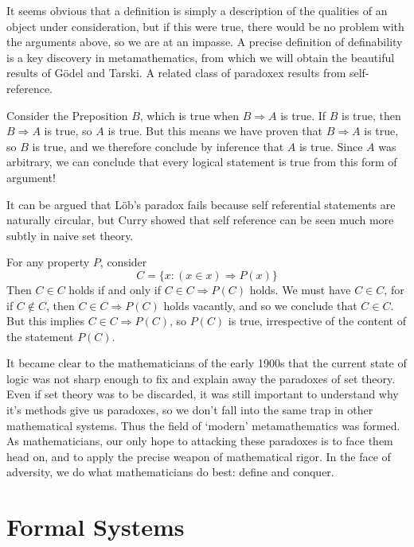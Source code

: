 It seems obvious that a definition is simply a description of the qualities of an object under consideration, but if this were true, there would be no problem with the arguments above, so we are at an impasse. A precise definition of definability is a key discovery in metamathematics, from which we will obtain the beautiful results of G\"{o}del and Tarski. A related class of paradoxex results from self-reference.

\begin{example}[L\"{o}b]
    Consider the Preposition $B$, which is true when $B \Rightarrow A$ is true. If $B$ is true, then $B \Rightarrow A$ is true, so $A$ is true. But this means we have proven that $B \Rightarrow A$ is true, so $B$ is true, and we therefore conclude by inference that $A$ is true. Since $A$ was arbitrary, we can conclude that every logical statement is true from this form of argument!
\end{example}

It can be argued that L\"{o}b's paradox fails because self referential statements are naturally circular, but Curry showed that self reference can be seen much more subtly in naive set theory.

\begin{example}[Curry]
    For any property $P$, consider
    \[ C = \{ x : (x \in x) \Rightarrow P(x) \} \]
    Then $C \in C$ holds if and only if $C \in C \Rightarrow P(C)$ holds. We must have $C \in C$, for if $C \not \in C$, then $C \in C \Rightarrow P(C)$ holds vacantly, and so we conclude that $C \in C$. But this implies $C \in C \Rightarrow P(C)$, so $P(C)$ is true, irrespective of the content of the statement $P(C)$.
\end{example}

It became clear to the mathematicians of the early 1900s that the current state of logic was not sharp enough to fix and explain away the paradoxes of set theory. Even if set theory was to be discarded, it was still important to understand why it's methods give us paradoxes, so we don't fall into the same trap in other mathematical systems. Thus the field of `modern' metamathematics was formed. As mathematicians, our only hope to attacking these paradoxes is to face them head on, and to apply the precise weapon of mathematical rigor. In the face of adversity, we do what mathematicians do best: define and conquer.

\section{Formal Systems}

